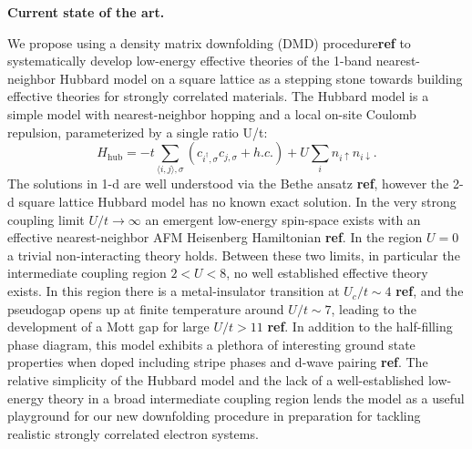 \documentclass{article}
\begin{document}
\textbf{Current state of the art.}

We propose using a density matrix downfolding (DMD) procedure\textbf{ref} to systematically develop low-energy effective theories of the 1-band nearest-neighbor Hubbard model on a square lattice as a stepping stone towards building effective theories for strongly correlated materials. The Hubbard model is a simple model with nearest-neighbor hopping and a local on-site Coulomb repulsion, parameterized by a single ratio U/t: 
\begin{equation}
H_\text{hub} = -t \sum_{\langle i,j \rangle,\sigma}( c_{i^\dagger,\sigma} c_{j,\sigma} + h.c.) + U \sum_i n_{i\uparrow} n_{i\downarrow}
\label{hubbard}.
\end{equation}
The solutions in 1-d are well understood via the Bethe ansatz \textbf{ref}, however the 2-d square lattice Hubbard model has no known exact solution.  In the very strong coupling limit $U/t \rightarrow \infty$ an emergent low-energy spin-space exists with an effective nearest-neighbor AFM Heisenberg Hamiltonian \textbf{ref}. In the region $U = 0$ a trivial non-interacting theory holds. Between these two limits, in particular the intermediate coupling region $2 < U < 8$, no well established effective theory exists. In this region there is a metal-insulator transition at $U_c/t \sim 4$ \textbf{ref}, and the pseudogap opens up at finite temperature around $U/t \sim 7$, leading to the development of a Mott gap for large $U/t > 11$ \textbf{ref}. In addition to the half-filling phase diagram, this model exhibits a plethora of interesting ground state properties when doped including stripe phases and d-wave pairing \textbf{ref}. The relative simplicity of the Hubbard model and the lack of a well-established low-energy theory in a broad intermediate coupling region lends the model as a useful playground for our new downfolding procedure in preparation for tackling realistic strongly correlated electron systems. 
\end{document}
